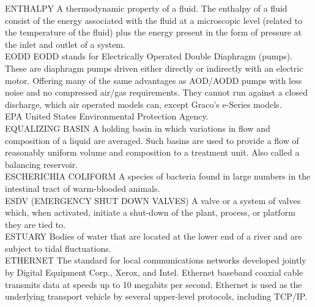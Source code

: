 \documentclass{article}
\begin{document}
ENTHALPY
A thermodynamic property of a fluid. The enthalpy of a fluid consist of the energy associated with the fluid at a microscopic level (related to the temperature of the fluid) plus the energy present in the form of pressure at the inlet and outlet of a system.
\vspace{0.3cm}\\
EODD
EODD stands for Electrically Operated Double Diaphragm (pumps). These are diaphragm pumps driven either directly or indirectly with an electric motor. Offering many of the same advantages as AOD/AODD pumps with less noise and no compressed air/gas requirements. They cannot run against a closed discharge, which air operated models can, except Graco’s e-Series models.
\vspace{0.3cm}\\
EPA
United States Environmental Protection Agency. 
\vspace{0.3cm}\\
EQUALIZING BASIN
A holding basin in which variations in flow and composition of a liquid are averaged. Such basins are used to provide a flow of reasonably uniform volume and composition to a treatment unit.  Also called a balancing reservoir.
\vspace{0.3cm}\\
ESCHERICHIA COLIFORM
A species of bacteria found in large numbers in the intestinal tract of warm-blooded animals.
\vspace{0.3cm}\\
ESDV (EMERGENCY SHUT DOWN VALVES)
A valve or a system of valves which, when activated, initiate a shut-down of the plant, process, or platform they are tied to.
\vspace{0.3cm}\\
ESTUARY
Bodies of water that are located at the lower end of a river and are subject to tidal fluctuations.
\vspace{0.3cm}\\
ETHERNET
The standard for local communications networks developed jointly by Digital Equipment Corp., Xerox, and Intel. Ethernet baseband coaxial cable transmits data at speeds up to 10 megabits per second. Ethernet is used as the underlying transport vehicle by several upper-level protocols, including TCP/IP.
\vspace{0.3cm}\\
\end{document}
